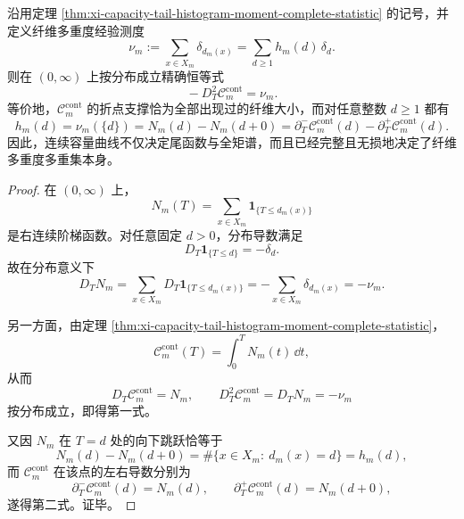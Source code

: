 \begin{theorem}[连续容量曲线的分布二阶导数恰为纤维多重度经验测度]\label{thm:xi-capacity-second-distribution-derivative-fiber-empirical-measure}
沿用定理 \ref{thm:xi-capacity-tail-histogram-moment-complete-statistic} 的记号，并定义纤维多重度经验测度
\[
\nu_m:=\sum_{x\in X_m}\delta_{d_m(x)}
=
\sum_{d\ge 1}h_m(d)\,\delta_d.
\]
则在 \((0,\infty)\) 上按分布成立精确恒等式
\[
\boxed{\;
-D_T^2\mathcal C_m^{\mathrm{cont}}=\nu_m.\;}
\]
等价地，\(\mathcal C_m^{\mathrm{cont}}\) 的折点支撑恰为全部出现过的纤维大小，而对任意整数 \(d\ge 1\) 都有
\[
\boxed{\;
h_m(d)
=
\nu_m(\{d\})
=
N_m(d)-N_m(d+0)
=
\partial_T^{-}\mathcal C_m^{\mathrm{cont}}(d)-\partial_T^{+}\mathcal C_m^{\mathrm{cont}}(d).\;}
\]
因此，连续容量曲线不仅决定尾函数与全矩谱，而且已经完整且无损地决定了纤维多重度多重集本身。
\end{theorem}
\begin{proof}
在 \((0,\infty)\) 上，
\[
N_m(T)=\sum_{x\in X_m}\mathbf 1_{\{T\le d_m(x)\}}
\]
是右连续阶梯函数。对任意固定 \(d>0\)，分布导数满足
\[
D_T\mathbf 1_{\{T\le d\}}=-\delta_d.
\]
故在分布意义下
\[
D_TN_m
=
\sum_{x\in X_m}D_T\mathbf 1_{\{T\le d_m(x)\}}
=
-\sum_{x\in X_m}\delta_{d_m(x)}
=
-\nu_m.
\]

另一方面，由定理 \ref{thm:xi-capacity-tail-histogram-moment-complete-statistic}，
\[
\mathcal C_m^{\mathrm{cont}}(T)=\int_0^T N_m(t)\,\dd t,
\]
从而
\[
D_T\mathcal C_m^{\mathrm{cont}}=N_m,
\qquad
D_T^2\mathcal C_m^{\mathrm{cont}}=D_TN_m=-\nu_m
\]
按分布成立，即得第一式。

又因 \(N_m\) 在 \(T=d\) 处的向下跳跃恰等于
\[
N_m(d)-N_m(d+0)=\#\{x\in X_m:\ d_m(x)=d\}=h_m(d),
\]
而 \(\mathcal C_m^{\mathrm{cont}}\) 在该点的左右导数分别为
\[
\partial_T^{-}\mathcal C_m^{\mathrm{cont}}(d)=N_m(d),
\qquad
\partial_T^{+}\mathcal C_m^{\mathrm{cont}}(d)=N_m(d+0),
\]
遂得第二式。证毕。
\end{proof}


